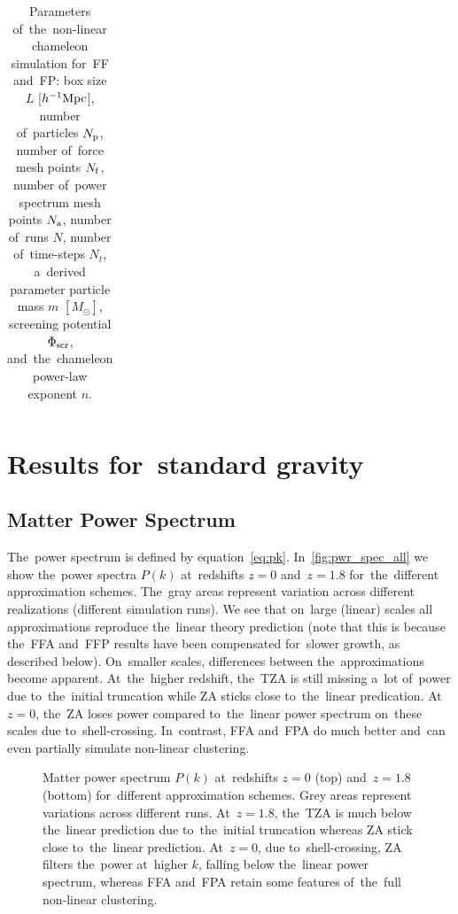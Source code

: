 \begin{landscape}
\begin{table}
{\begin{tabular}{ ccccccc cc}
    \hline
    \end{tabular}
    }
    \caption{Parameters of~the~non-linear chameleon simulation for~FF and~FP: box size $L$ [$h^{-1}\text{Mpc}$], number of~particles $N_{\rm p}$, number of~force mesh points $N_{\rm f}$, number of~power spectrum mesh points $N_{\rm a}$, number of~runs $N$, number of~time-steps $N_t$, a~derived parameter particle mass $m$ $[M_\odot]$, screening potential $\Phi_{\text{\scriptsize scr}}$, and~the~chameleon power-law exponent $n$.}
    \label{tab:cham_param_CHI_nl}
    \end{table}
     \end{landscape}

\section{Results for~standard gravity}
\subsection{Matter Power Spectrum}
\label{sec:pwr_spec}
The~power spectrum is defined by equation~\eqref{eq:pk}. In~\autoref{fig:pwr_spec_all} we show the~power spectra $P(k)$ at~redshifts $z=0$ and~$z=1.8$ for~the~different approximation schemes. The~gray areas represent variation across different realizations (different simulation runs). We see that on~large (linear) scales all approximations reproduce the~linear theory prediction (note that this is because the~FFA and~FFP results have been compensated for~slower growth, as described below). On~smaller scales, differences between the~approximations become apparent. At~the~higher redshift, the~TZA is still missing a~lot of~power due to~the~initial truncation while ZA sticks close to~the~linear predication. At~$z=0$, the~ZA loses power compared to~the~linear power spectrum on~these scales due to~shell-crossing. In~contrast, FFA and~FPA do much better and~can even partially simulate non-linear clustering.

\begin{figure}[!hbt]
\centering
	\begin{subfigure}{0.9\textwidth}
	\end{subfigure}
	\begin{subfigure}{0.9\textwidth}
	\end{subfigure}
	\begin{subfigure}{0.9\textwidth}
	\end{subfigure}
	\caption{Matter power spectrum $P(k)$ at~redshifts $z=0$ (top) and~$z=1.8$ (bottom) for~different approximation schemes. Grey areas represent variations across different runs. At~$z=1.8$, the~TZA is much below the~linear prediction due to~the~initial truncation whereas ZA stick close to~the~linear prediction. At~$z=0$, due to~shell-crossing, ZA filters the~power at~higher $k$, falling below the~linear power spectrum, whereas FFA and~FPA retain some features of~the~full non-linear clustering.}
    \label{fig:pwr_spec_all}
\end{figure}

